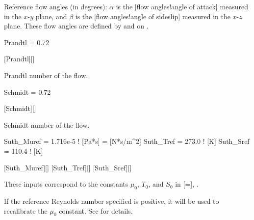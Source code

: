 \begin{nmldescbody}
Reference flow angles (in degrees):
$\alpha$ is the
[flow angles!angle of attack]
measured in the $x$-$y$ plane, and
$\beta$  is the
[flow angles!angle of sideslip]
measured in the $x$-$z$ plane.
%
These flow angles are defined by
 and
 on \pref{\pageref{FIG:FlowAngle}}.
\end{nmldescbody}


\begin{nmldescitem}
Prandtl = 0.72
\end{nmldescitem}
[Prandtl][]

\begin{nmldescbody}
Prandtl number of the flow.
\end{nmldescbody}


\begin{nmldescitem}
Schmidt = 0.72
\end{nmldescitem}
[Schmidt][]

\begin{nmldescbody}
Schmidt number of the flow.
\end{nmldescbody}


\begin{nmldescitem}
Suth_Muref = 1.716e-5  ! [Pa*s] = [N*s/m^2]
Suth_Tref  = 273.0     ! [K]
Suth_Sref  = 110.4     ! [K]
\end{nmldescitem}
[Suth\_Muref][]
[Suth\_Tref][]
[Suth\_Sref][]

\begin{nmldescbody}
These inputs correspond to the constants
  $\mu_0$,
  $T_0$, and
  $S_0$
in [=],
.

\noindent
\NOTE
If the reference Reynolds number specified is positive,
it will be used to recalibrate the $\mu_0$ constant.
See  for details.
\end{nmldescbody}


